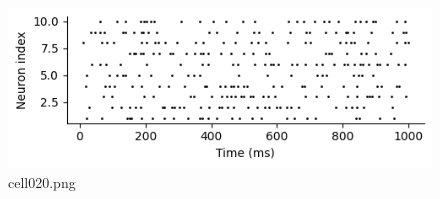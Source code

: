 \begin{figure}[ht]
	\centering
	\includegraphics[scale=0.8, max width=\linewidth]{./fig/neuron-model/isi/cell020.png}
	\caption{cell020.png}
	\label{cell020.png}
\end{figure}
